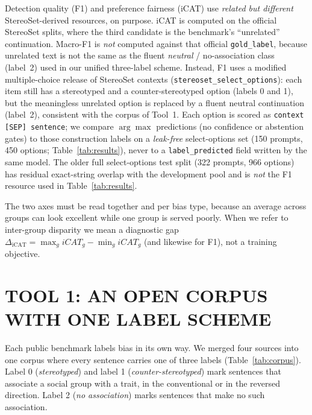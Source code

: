 \documentclass{IEEEcsmag}
\begin{document}
Detection quality (F1) and preference fairness (iCAT) use \emph{related but different} StereoSet-derived resources, on purpose. iCAT is computed on the official StereoSet splits, where the third candidate is the benchmark's ``unrelated'' continuation. Macro-F1 is \emph{not} computed against that official \texttt{gold\_label}, because unrelated text is not the same as the fluent \emph{neutral} / no-association class (label~2) used in our unified three-label scheme. Instead, F1 uses a modified multiple-choice release of StereoSet contexts (\texttt{stereoset\_select\_options}): each item still has a stereotyped and a counter-stereotyped option (labels 0 and 1), but the meaningless unrelated option is replaced by a fluent neutral continuation (label~2), consistent with the corpus of Tool~1. Each option is scored as \texttt{context [SEP] sentence}; we compare $\arg\max$ predictions (no confidence or abstention gates) to those construction labels on a \emph{leak-free} select-options set (150 prompts, 450 options; Table~\ref{tab:results}), never to a \texttt{label\_predicted} field written by the same model. The older full select-options test split (322 prompts, 966 options) has residual exact-string overlap with the development pool and is \emph{not} the F1 resource used in Table~\ref{tab:results}.

The two axes must be read together and per bias type, because an average across groups can look excellent while one group is served poorly. When we refer to inter-group disparity we mean a diagnostic gap $\Delta_{\mathrm{iCAT}}=\max_g\mathit{iCAT}_g-\min_g\mathit{iCAT}_g$ (and likewise for F1), not a training objective.

\section{TOOL 1: AN OPEN CORPUS WITH ONE LABEL SCHEME}

Each public benchmark labels bias in its own way. We merged four sources into one corpus where every sentence carries one of three labels (Table~\ref{tab:corpus}). Label 0 (\emph{stereotyped}) and label 1 (\emph{counter-stereotyped}) mark sentences that associate a social group with a trait, in the conventional or in the reversed direction. Label 2 (\emph{no association}) marks sentences that make no such association.
\end{document}
